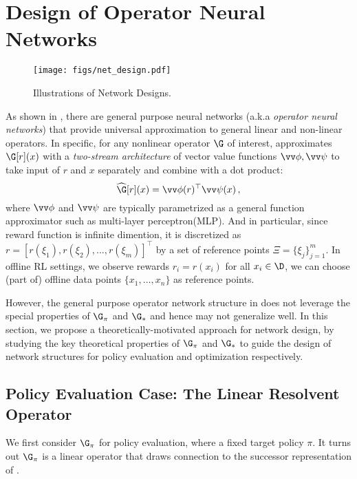     \section{Design of Operator Neural Networks}
\label{sec:design}


\begin{figure}[t]
    \centering
    \texttt{[image: figs/net\_design.pdf]}
    \vspace{-1.5em}
    \caption{Illustrations of Network Designs.}
    \label{fig:networks}
\end{figure}



As shown in \citet{lu2019deeponet}, there are general purpose  neural networks (a.k.a \textit{operator neural networks}) that provide universal approximation to general linear and non-linear operators. 
In specific, for any nonlinear operator $\G$ of interest, \citet{lu2019deeponet} approximates $\G[r](x)$ with a \textit{two-stream architecture} of vector value functions $\vv \phi,\vv \psi$ to take input of $r$ and $x$ separately and combine with a dot product:
\begin{equation}\label{eqn:general_purpose_design}
    \widehat{\G}[r](x) = {\vv \phi}(r)^\top {\vv \psi}(x)\,,
\end{equation}
where $\vv \phi$ and $\vv \psi$ are typically parametrized as a general function approximator such as multi-layer perceptron(MLP).
And in particular, since reward function is infinite dimention, 
it is discretized as $r = [r(\xi_1), r(\xi_2),...,r(\xi_m)]^\top$ 
by a set of reference points $\Xi = \{\xi_j\}_{j=1}^m$.
In offline RL settings, we observe rewards $r_i = r(x_i)$ for all $x_i\in \D$,
we can choose (part of) offline data points $\{x_1,\ldots,x_n\}$ as reference points.

However, the general purpose operator network structure in \citet{lu2019deeponet} 
does not leverage the special properties of $\G_\pi$ and $\G_*$ and hence may not generalize well. 
In this section, we propose a theoretically-motivated approach for network design, 
by studying the key theoretical properties of $\G_\pi$ and $\G_*$ 
to guide the design of network structures for policy evaluation and optimization respectively. 

\subsection{Policy Evaluation Case: The Linear Resolvent Operator}
We first consider $\G_\pi$ for policy evaluation, where a fixed target policy $\pi$. It turns out $\G_\pi$ is a linear operator that draws connection to the 
successor representation of \citet{dayan1993improving}. 

